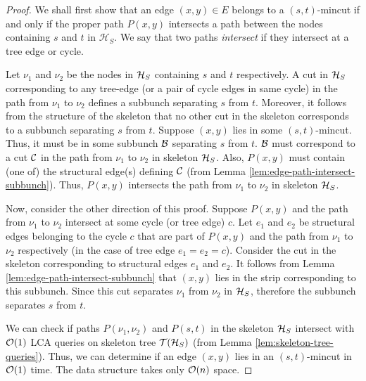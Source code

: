 \begin{proof}
We shall first show that an edge $(x,y)\in E$ belongs to a $(s,t)$-mincut if and only if the proper path $P(x,y)$ intersects a path between the nodes containing $s$ and $t$ in $\mathcal H_{S}$. We say that two paths {\em intersect} if they intersect at a tree edge or cycle.


Let $\nu_1$ and $\nu_2$ be the nodes in ${\cal H}_S$ containing $s$ and $t$ respectively. A cut in ${\cal H}_S$ corresponding to any tree-edge (or a pair of cycle edges in same cycle) in the path from $\nu_1$ to $\nu_2$ defines a subbunch separating $s$ from $t$. Moreover, it follows from the structure of the skeleton that no other cut in the skeleton corresponds to a subbunch separating $s$ from $t$. Suppose $(x,y)$ lies in some $(s,t)$-mincut. Thus, it must be in some subbunch ${\cal B}$ separating $s$ from $t$. ${\cal B}$ must correspond to a cut $\cal{C}$ in the path from $\nu_1$ to $\nu_2$ in skeleton ${\cal H}_S$. Also, $P(x,y)$ must contain (one of) the structural edge(s) defining $\cal{C}$ (from Lemma \ref{lem:edge-path-intersect-subbunch}). Thus, $P(x,y)$ intersects the path from $\nu_1$ to $\nu_2$ in skeleton ${\cal H}_S$.

Now, consider the other direction of this proof. Suppose $P(x,y)$ and the path from $\nu_1$ to $\nu_2$ intersect at some cycle (or tree edge) $c$. Let $e_1$ and $e_2$ be structural edges belonging to the cycle $c$ that are part of $P(x,y)$ and the path from $\nu_1$ to $\nu_2$ respectively (in the case of tree edge $e_1=e_2=c$). Consider the cut in the skeleton corresponding to structural edges $e_1$ and $e_2$. It follows from Lemma \ref{lem:edge-path-intersect-subbunch} that $(x,y)$ lies in the strip corresponding to this subbunch. Since this cut separates $\nu_1$ from $\nu_2$ in ${\cal H}_S$, therefore the subbunch separates $s$ from $t$.

We can check if paths $P(\nu_1,\nu_2)$ and $P(s,t)$ in the skeleton ${\cal H}_S$ intersect with ${\cal O}(1)$ LCA queries on skeleton tree ${\cal T}({\cal H}_S)$ (from Lemma \ref{lem:skeleton-tree-queries}). Thus, we can determine if an edge $(x,y)$ lies in an $(s,t)$-mincut in ${\cal O}(1)$ time. The data structure takes only ${\cal O}(n)$ space.
\end{proof}

